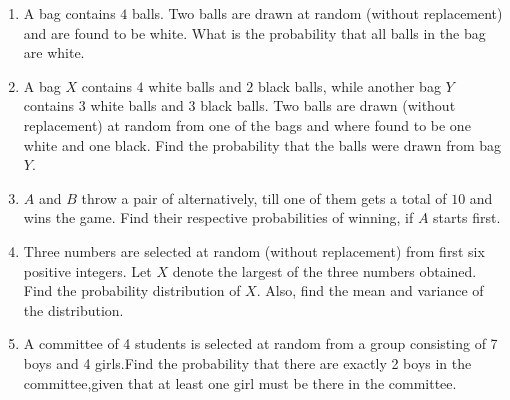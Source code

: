 \begin{enumerate}
    \item A bag contains $4$ balls. Two balls are drawn at random (without replacement) and are found to be white. What is the probability that all balls in the bag are white.
    \item A bag $X$ contains $4$ white balls and $2$ black balls, while another bag $Y$ contains $3$ white balls and $3$ black balls. Two balls are drawn (without replacement) at random from  one of the bags and where found to be one white and one black. Find the probability that the balls were  drawn from bag $Y$.
    \item $A$ and $B$ throw a pair of alternatively, till one of them gets a total of $10$ and wins the game. Find their respective probabilities of winning, if $A$ starts first.
    \item Three numbers are selected at random (without replacement) from first six positive integers. Let $X$ denote the largest of the three numbers obtained. Find the probability distribution of $X$. Also, find the mean and variance of the distribution.
    \item A committee of 4 students is selected at random from a group consisting of 7 boys and 4 girls.Find the probability that there are exactly 2 boys in the committee,given that at least one girl must be there in the committee.


\end{enumerate}
